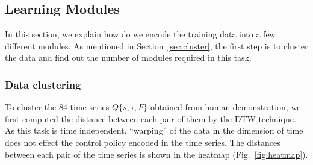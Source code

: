 






\subsection{Learning Modules}
\label{learning}

In this section, we explain how do we encode the training data into a few different modules. As mentioned in Section~\ref{sec:cluster}, the first step is to cluster the data and find out the number of modules required in this task.

\subsubsection{Data clustering}
To cluster the 84 time series $Q\{s,\tau,F\}$ obtained from human demonstration, we first computed the distance between each pair of them by the DTW technique. As this task is time independent, ``warping'' of the data in the dimension of time does not effect the control policy encoded in the time series. The distances between each pair of the time series is shown in the heatmap (Fig.~\ref{fig:heatmap}).

